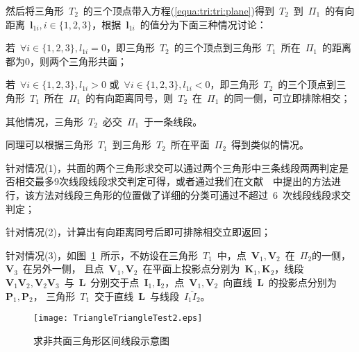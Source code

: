 然后将三角形~$T_2$~的三个顶点带入方程(\ref{equa:tri:tri:plane})得到~$T_2$~到~$\Pi_1$~的有向距离~$\bm{l}_{1i}, i \in \{1,2,3\}$，根据~$\bm{l}_{1i}$~的值分为下面三种情况讨论：\\ \indent
\begin{inparaenum}[(1)]
  \item 若~$\forall i \in \{1,2,3\}, l_{1i} = 0$，即三角形~$T_2$~的三个顶点到三角形~$T_1$~所在~$\Pi_1$~的距离都为$0$，则两个三角形共面；\\ \indent
  \item 若~$\forall i \in \{1,2,3\}, l_{1i} > 0$ 或~$\forall i \in \{1,2,3\}, l_{1i} < 0$，即三角形~$T_2$~的三个顶点到三角形~$T_1$~所在~$\Pi_1$~的有向距离同号，则~$T_2$~在~$\Pi_1$~的同一侧，可立即排除相交；\\ \indent
  \item 其他情况，三角形~$T_2$~必交~$\Pi_1$~于一条线段。
\end{inparaenum}

同理可以根据三角形~$T_1$~到三角形~$T_2$~所在平面~$\Pi_2$~得到类似的情况。

针对情况(1)，共面的两个三角形求交可以通过两个三角形中三条线段两两判定是否相交最多9次线段线段求交判定可得，或者通过我们在文献~~中提出的方法进行，该方法对线段三角形的位置做了详细的分类可通过不超过~6~次线段线段求交判定；

针对情况(2)，计算出有向距离同号后即可排除相交立即返回；

针对情况(3)，如图~\ref{fig:two:triangle:ui2}~所示，不妨设在三角形~$T_1$~中，点~$\bm{V}_1, \bm{V}_2$~在~$\Pi_2$的一侧，$\bm{V}_3$~在另外一侧，
且点~$\bm{V}_1, \bm{V}_2$~在平面上投影点分别为~$\bm{K}_1,\bm{K}_2$，线段~$\bm{V}_1\bm{V}_2, \bm{V}_2\bm{V}_3$~与~$\bm{L}$~分别交于点~$\bm{I}_1,\bm{I}_2$，点~$\bm{V}_1,\bm{V}_2$~向直线~$\bm{L}$~的投影点分别为~$\bm{P}_1,\bm{P}_2$，
三角形~$T_1$~交于直线~$\bm{L}$~与线段~$\overline{I_1I_2}$。%

\begin{figure}[htbp]
  \centering
    \texttt{[image: TriangleTriangleTest2.eps]}
    \caption{求非共面三角形区间线段示意图\cite{Moller1997}}
  \label{fig:two:triangle:ui2}
\end{figure}

